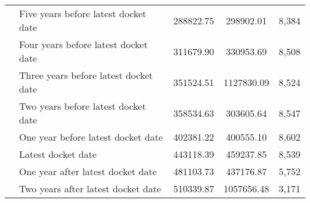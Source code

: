 \begin{tabular}{llccc}
 & Five years before latest docket date & 288822.75 & 298902.01 & 8,384 \\
 & Four years before latest docket date & 311679.90 & 330953.69 & 8,508 \\
 & Three years before latest docket date & 351524.51 & 1127830.09 & 8,524 \\
 & Two years before latest docket date & 358534.63 & 303605.64 & 8,547 \\
 & One year before latest docket date & 402381.22 & 400555.10 & 8,602 \\
 & Latest docket date & 443118.39 & 459237.85 & 8,539 \\
 & One year after latest docket date & 481103.73 & 437176.87 & 5,752 \\
 & Two years after latest docket date & 510339.87 & 1057656.48 & 3,171 \\
\cline{1-5}
\bottomrule
\end{tabular}
